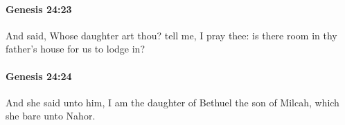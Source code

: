 		\paragraph{Genesis 24:23} %
			\label{GENESIS-24-23}

			And said, Whose daughter art thou? tell me, I pray thee: is there room in thy father's house for us to lodge in?


		\paragraph{Genesis 24:24} %
			\label{GENESIS-24-24}

			And she said unto him, I am the daughter of Bethuel the son of Milcah, which she bare unto Nahor.


